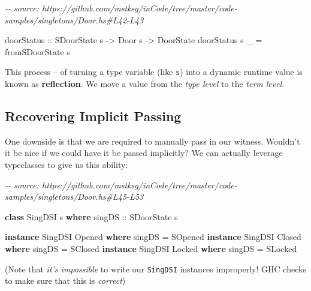 \documentclass[]{article}
\newenvironment{Shaded}{}{}
\newcommand{\CommentTok}[1]{\textcolor[rgb]{0.38,0.63,0.69}{\textit{#1}}}
\newcommand{\DataTypeTok}[1]{\textcolor[rgb]{0.56,0.13,0.00}{#1}}
\newcommand{\KeywordTok}[1]{\textcolor[rgb]{0.00,0.44,0.13}{\textbf{#1}}}
\newcommand{\NormalTok}[1]{#1}
\newcommand{\OtherTok}[1]{\textcolor[rgb]{0.00,0.44,0.13}{#1}}
\begin{document}
\begin{Shaded}
\begin{Highlighting}[]
\CommentTok{{-}{-} source: https://github.com/mstksg/inCode/tree/master/code{-}samples/singletons/Door.hs\#L42{-}L43}

\OtherTok{doorStatus ::} \DataTypeTok{SDoorState}\NormalTok{ s }\OtherTok{{-}\textgreater{}} \DataTypeTok{Door}\NormalTok{ s }\OtherTok{{-}\textgreater{}} \DataTypeTok{DoorState}
\NormalTok{doorStatus s \_ }\OtherTok{=}\NormalTok{ fromSDoorState s}
\end{Highlighting}
\end{Shaded}

This process -- of turning a type variable (like \texttt{s}) into a dynamic
runtime value is known as \textbf{reflection}. We move a value from the
\emph{type level} to the \emph{term level}.

\subsection{Recovering Implicit Passing}\label{recovering-implicit-passing}

One downside is that we are required to manually pass in our witness. Wouldn't
it be nice if we could have it be passed implicitly? We can actually leverage
typeclasses to give us this ability:

\begin{Shaded}
\begin{Highlighting}[]
\CommentTok{{-}{-} source: https://github.com/mstksg/inCode/tree/master/code{-}samples/singletons/Door.hs\#L45{-}L53}

\KeywordTok{class} \DataTypeTok{SingDSI}\NormalTok{ s }\KeywordTok{where}
\OtherTok{    singDS ::} \DataTypeTok{SDoorState}\NormalTok{ s}

\KeywordTok{instance} \DataTypeTok{SingDSI} \DataTypeTok{\textquotesingle{}Opened} \KeywordTok{where}
\NormalTok{    singDS }\OtherTok{=} \DataTypeTok{SOpened}
\KeywordTok{instance} \DataTypeTok{SingDSI} \DataTypeTok{\textquotesingle{}Closed} \KeywordTok{where}
\NormalTok{    singDS }\OtherTok{=} \DataTypeTok{SClosed}
\KeywordTok{instance} \DataTypeTok{SingDSI} \DataTypeTok{\textquotesingle{}Locked} \KeywordTok{where}
\NormalTok{    singDS }\OtherTok{=} \DataTypeTok{SLocked}
\end{Highlighting}
\end{Shaded}

(Note that \emph{it's impossible} to write our \texttt{SingDSI} instances
improperly! GHC checks to make sure that this is \emph{correct})
\end{document}
